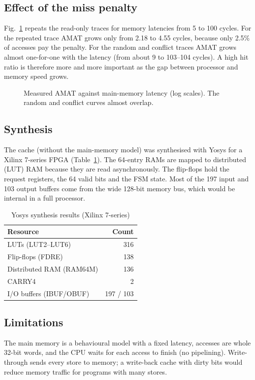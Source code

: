 \documentclass[conference]{IEEEtran}
\begin{document}
\subsection{Effect of the miss penalty}
Fig.~\ref{fig:amat} repeats the read-only traces for memory latencies from 5 to 100 cycles. For the repeated trace
AMAT grows only from 2.18 to 4.55 cycles, because only 2.5\% of accesses pay the penalty. For the random and
conflict traces AMAT grows almost one-for-one with the latency (from about 9 to 103--104 cycles). A high hit ratio is therefore
more and more important as the gap between processor and memory speed grows.

\begin{figure}[t]
\centering

\caption{Measured AMAT against main-memory latency (log scales). The random and conflict curves almost overlap.}
\label{fig:amat}
\end{figure}

\subsection{Synthesis}
The cache (without the main-memory model) was synthesised with Yosys for a Xilinx 7-series FPGA
(Table~\ref{tab:synth}). The 64-entry RAMs are mapped to distributed (LUT) RAM because they are read
asynchronously. The flip-flops hold the request registers, the 64 valid bits and the FSM state. Most of the 197
input and 103 output buffers come from the wide 128-bit memory bus, which would be internal in a full processor.

\begin{table}[h]
\centering
\caption{Yosys synthesis results (Xilinx 7-series)}
\label{tab:synth}
\begin{tabular}{lr}
\toprule
Resource & Count \\
\midrule
LUTs (LUT2--LUT6) & 316 \\
Flip-flops (FDRE) & 138 \\
Distributed RAM (RAM64M) & 136 \\
CARRY4 & 2 \\
I/O buffers (IBUF/OBUF) & 197 / 103 \\
\bottomrule
\end{tabular}
\end{table}

\subsection{Limitations}
The main memory is a behavioural model with a fixed latency, accesses are whole 32-bit words, and the CPU waits
for each access to finish (no pipelining). Write-through sends every store to memory; a write-back cache with dirty
bits would reduce memory traffic for programs with many stores.
\end{document}
